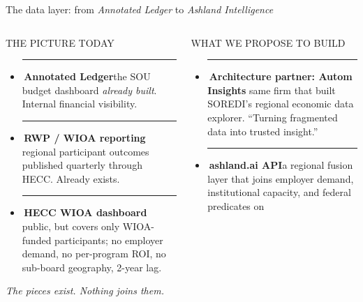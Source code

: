 \documentclass[aspectratio=169,11pt]{beamer}
\newcommand{\eyebrow}[1]{%
  {\sffamily\fontsize{7.5pt}{9pt}\selectfont
   \color{textMuted}%
   \MakeUppercase{#1}%
  }%
}
\newcommand{\theEyebrowText}{}
\newcommand{\frametitleEyebrow}[1]{\renewcommand{\theEyebrowText}{#1}}
\newcommand{\pdot}[1]{%
  {\color{#1}\rule[0.15ex]{0.55ex}{0.55ex}}%
}
\begin{document}
\frametitleEyebrow{Engine / data fusion as institutional asset}
\begin{frame}{The data layer: from \emph{Annotated Ledger} to \emph{Ashland Intelligence}}
  \begin{columns}[T,onlytextwidth]
    \begin{column}{0.48\textwidth}
      \rmfamily\fontsize{10pt}{13pt}\selectfont
      \color{textPrimary}
      \eyebrow{the picture today}
      \vspace{4pt}
      \begin{itemize}\itemsep1pt
        \item \pdot{cSou}\,\textbf{Annotated Ledger}\;\textemdash{}\;the
              SOU budget dashboard \textit{already built}.
              Internal financial visibility.
        \item \pdot{cRwp}\,\textbf{RWP / WIOA reporting}\;\textemdash{}\;
              regional participant outcomes published quarterly
              through HECC. Already exists.
        \item \pdot{cPell}\,\textbf{HECC WIOA dashboard}\;\textemdash{}\;
              public, but covers only WIOA-funded participants;
              no employer demand, no per-program ROI, no sub-board
              geography, 2-year lag.
      \end{itemize}
      \vspace{6pt}
      \color{textSecondary}\itshape\fontsize{10pt}{13pt}\selectfont
      The pieces exist. Nothing joins them.
    \end{column}
    \begin{column}{0.50\textwidth}
      \rmfamily\fontsize{10pt}{13pt}\selectfont
      \color{textPrimary}
      \eyebrow{what we propose to build}
      \vspace{4pt}
      \begin{itemize}\itemsep1pt
        \item \pdot{cWr}\,\textbf{Architecture partner: Autom Insights}\;\textemdash{}\;
              same firm that built SOREDI's regional economic data
              explorer. ``Turning fragmented data into trusted insight.''
        \item \pdot{oil}\,\textbf{ashland.ai API}\;\textemdash{}\;a
              regional fusion layer that joins employer demand,
              institutional capacity, and federal predicates on

\end{itemize}
\end{column}
\end{columns}
\end{frame}
\end{document}
